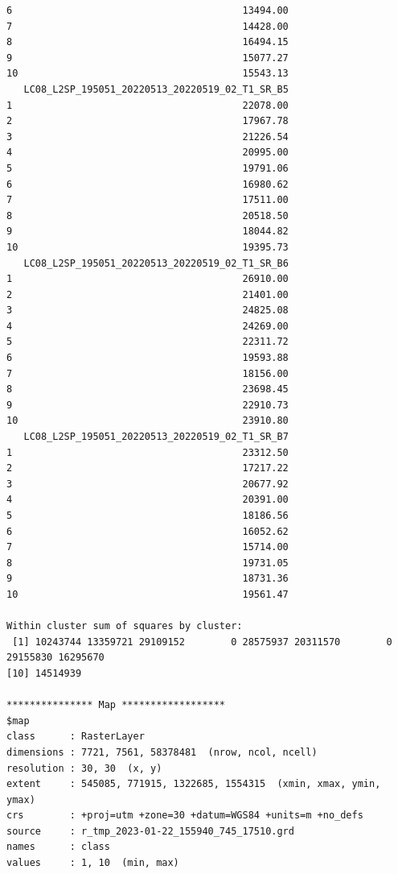 \documentclass[atmosphere,article,submit,pdftex,moreauthors]{Definitions/mdpi}
\begin{document}
\begin{small}
\begin{verbatim}
6                                        13494.00
7                                        14428.00
8                                        16494.15
9                                        15077.27
10                                       15543.13
   LC08_L2SP_195051_20220513_20220519_02_T1_SR_B5
1                                        22078.00
2                                        17967.78
3                                        21226.54
4                                        20995.00
5                                        19791.06
6                                        16980.62
7                                        17511.00
8                                        20518.50
9                                        18044.82
10                                       19395.73
   LC08_L2SP_195051_20220513_20220519_02_T1_SR_B6
1                                        26910.00
2                                        21401.00
3                                        24825.08
4                                        24269.00
5                                        22311.72
6                                        19593.88
7                                        18156.00
8                                        23698.45
9                                        22910.73
10                                       23910.80
   LC08_L2SP_195051_20220513_20220519_02_T1_SR_B7
1                                        23312.50
2                                        17217.22
3                                        20677.92
4                                        20391.00
5                                        18186.56
6                                        16052.62
7                                        15714.00
8                                        19731.05
9                                        18731.36
10                                       19561.47

Within cluster sum of squares by cluster:
 [1] 10243744 13359721 29109152        0 28575937 20311570        0 29155830 16295670
[10] 14514939

*************** Map ******************
$map
class      : RasterLayer 
dimensions : 7721, 7561, 58378481  (nrow, ncol, ncell)
resolution : 30, 30  (x, y)
extent     : 545085, 771915, 1322685, 1554315  (xmin, xmax, ymin, ymax)
crs        : +proj=utm +zone=30 +datum=WGS84 +units=m +no_defs 
source     : r_tmp_2023-01-22_155940_745_17510.grd 
names      : class 
values     : 1, 10  (min, max)
\end{verbatim} 
\end{small}



\end{document}
